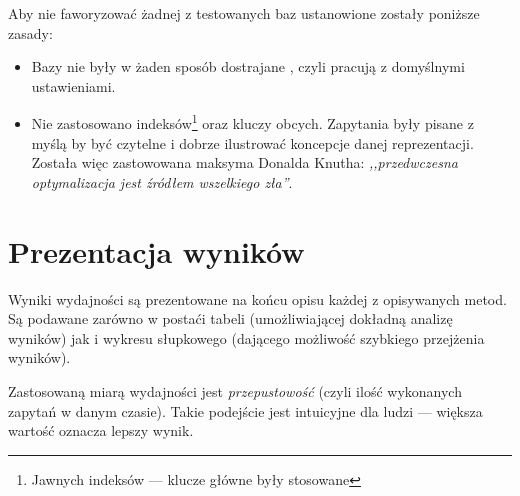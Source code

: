 Aby nie faworyzować żadnej z testowanych baz ustanowione zostały poniższe zasady:
\begin{itemize}
    \item Bazy nie były w żaden sposób dostrajane , czyli pracują z domyślnymi ustawieniami.
    \item Nie zastosowano indeksów\footnote{Jawnych indeksów --- klucze główne były stosowane}
        oraz kluczy obcych.
    Zapytania były pisane z myślą by być czytelne i dobrze ilustrować koncepcje danej reprezentacji.
    Została więc zastowowana maksyma Donalda Knutha: \emph{,,przedwczesna optymalizacja jest źródłem wszelkiego zła''}.
\end{itemize}

\section*{Prezentacja wyników}

Wyniki wydajności są prezentowane na końcu opisu każdej z opisywanych metod.
Są podawane zarówno w postaći tabeli (umożliwiającej dokładną analizę wyników)
jak i wykresu słupkowego (dającego możliwość szybkiego przejżenia wyników).


Zastosowaną miarą wydajności jest \emph{przepustowość} (czyli ilość wykonanych zapytań w danym czasie).
Takie podejście jest intuicyjne dla ludzi --- większa wartość oznacza lepszy wynik. 
